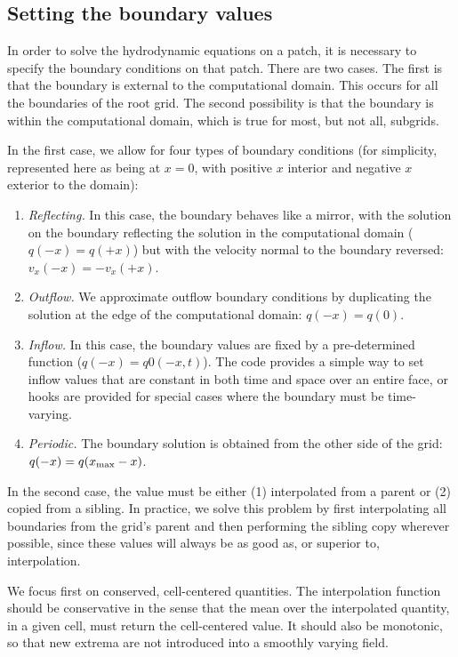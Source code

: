 \subsection{Setting the boundary values}
\label{sec:interpolation}

In order to solve the hydrodynamic equations on a patch, it is
necessary to specify the boundary conditions on that patch.  There are
two cases.  The first is that the boundary is external to the
computational domain.  This occurs for all the boundaries of the root
grid.  The second possibility is that the boundary is within the
computational domain, which is true for most, but not all, subgrids.


In the first case, we allow for four types of boundary conditions (for
simplicity, represented here as being at $x=0$, with positive $x$
interior and negative $x$ exterior to the domain):

\begin{enumerate}
  \item{\em Reflecting.} In this case, the boundary behaves like a
    mirror, with the solution on the boundary reflecting the solution
    in the computational domain ($q(-x) = q(+x)$) but with the
    velocity normal to the boundary reversed: $v_x(-x) = -v_x(+x)$.
  \item{\em Outflow.}  We approximate outflow boundary conditions by
    duplicating the solution at the edge of the computational domain:
    $q(-x) = q(0)$.
  \item{\em Inflow.} In this case, the boundary values are fixed by a
    pre-determined function ($q(-x) = q0(-x,t)$).  The code provides a
    simple way to set inflow values that are constant in both time and
    space over an entire face, or hooks are provided for special cases
    where the boundary must be time-varying.
  \item{\em Periodic.} The boundary solution is obtained from the
    other side of the grid: $q(-x) = q(x_{\rm{max}}-x)$.
\end{enumerate}

In the second case, the value must be either (1) interpolated from a
parent or (2) copied from a sibling.  In practice, we solve this
problem by first interpolating all boundaries from the grid's parent
and then performing the sibling copy wherever possible, since these
values will always be as good as, or superior to, interpolation.

We focus first on conserved, cell-centered quantities.  The
interpolation function should be conservative in the sense that the
mean over the interpolated quantity, in a given cell, must return the
cell-centered value.  It should also be monotonic, so that new extrema
are not introduced into a smoothly varying field.


